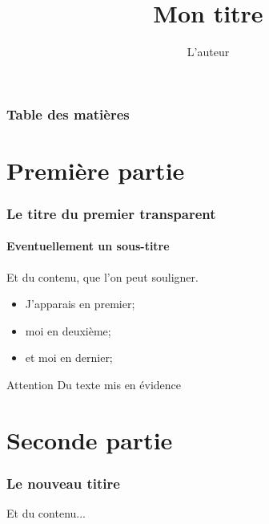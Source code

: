\documentclass{beamer}
\title{Mon titre}
\author{L'auteur}
\begin{document}
\begin{frame}
  \titlepage
\end{frame}

\begin{frame}
  \frametitle{Table des matières}
  \tableofcontents
\end{frame}

\section{Première partie}
\begin{frame}
  \frametitle{Le titre du premier transparent}
  \framesubtitle{Eventuellement un sous-titre}

  Et du contenu, que l'on peut
  \alert{souligner}.

  \begin{itemize}
    \item<1-> J'apparais en premier;
    \item<2-> moi en deuxième;
    \item<3-> et moi en dernier;
  \end{itemize}

  \begin{block}{Attention}
    Du texte mis en évidence
  \end{block}
\end{frame}

\section{Seconde partie}
\begin{frame}
  \frametitle{Le nouveau titire}
  Et du contenu...
\end{frame}
\end{document}

